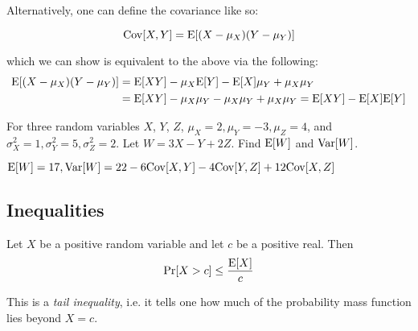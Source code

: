 \documentclass[../main.tex]{subfiles}
\begin{document}
Alternatively, one can define the covariance like so: 
\begin{definition}[Covariance]
\[\mathrm{Cov}[X, Y] = \mathrm E[(X - \mu_X)(Y - \mu_Y)] \]
\end{definition}
which we can show is equivalent to the above via the following: 
\begin{align*}
\mathrm E[(X - \mu_X)(Y - \mu_Y)] &= \mathrm E[XY] - \mu_X \mathrm E[Y] - \mathrm E[X] \mu_Y + \mu_X \mu_Y \\
&= \mathrm E[XY] - \mu_X \mu_Y - \mu_X \mu_Y  + \mu_X \mu_Y = \mathrm E[XY] - \mathrm E[X] \mathrm E[Y]
\end{align*}

\begin{example}
    For three random variables $X$, $Y$, $Z$, $\mu_X = 2, \mu_Y = -3, \mu_Z = 4$, and $\sigma_X^2 = 1, \sigma_Y^2 = 5, \sigma_Z^2 = 2$. Let $W = 3X - Y + 2Z$. Find $\mathrm E[W]$ and $\mathrm{Var}[W]$.
\end{example}
\begin{solution}
$\mathrm E[W] = 17, \mathrm{Var}[W] = 22 - 6 \mathrm{Cov}[X, Y] - 4 \mathrm{Cov}[Y, Z] + 12 \mathrm{Cov}[X, Z]$
\end{solution}

\subsection{Inequalities}

\begin{theorem}
Let $X$ be a positive random variable and let $c$ be a positive real. Then
\[
    \mathrm{Pr}[X > c] \leq \frac{\mathrm E[X]}{c}
\]
\end{theorem}
\begin{remark}
This is a \textit{tail inequality}, i.e. it tells one how much of the probability mass function lies beyond $X=c$. 
\end{remark}
\end{document}
